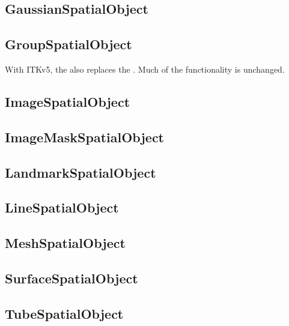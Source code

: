 \subsection{GaussianSpatialObject}
\label{sec:GaussianSpatialObject}



\subsection{GroupSpatialObject}
\label{sec:GroupSpatialObject}


With ITKv5, the  also replaces the
 . Much of the functionality is unchanged.



\subsection{ImageSpatialObject}
\label{sec:ImageSpatialObject}



\subsection{ImageMaskSpatialObject}
\label{sec:ImageMaskSpatialObject}



\subsection{LandmarkSpatialObject}
\label{sec:LandmarkSpatialObject}



\subsection{LineSpatialObject}
\label{sec:LineSpatialObject}



\subsection{MeshSpatialObject}
\label{sec:MeshSpatialObject}



\subsection{SurfaceSpatialObject}
\label{sec:SurfaceSpatialObject}



\subsection{TubeSpatialObject}

